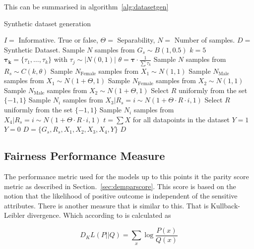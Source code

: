 This can be summarised in algorithm~\ref{alg:datasetgen}

\begin{algorithm}
    \caption{Synthetic dataset generation}
    \begin{algorithmic}
        \REQUIRE $I = $ Informative. True or false, $\Theta = $ Separability, $N =$ Number of samples.
        \ENSURE $D = $ Synthetic Dataset.
        \STATE Sample $N$ samples from $G_s \sim B(1, 0.5)$
        \STATE $k = 5$
        \STATE $\boldsymbol{\tau_k} = \{ \tau_1, \dots, \tau_k \}$ with $\tau_j \sim |N(0, 1)|$
        \STATE $\theta = \boldsymbol{\tau} \cdot \frac{1}{\sum \tau_k}$
        \STATE Sample $N$ samples from $R_s \sim C(k, \theta)$
        \STATE Sample $N_{\text{Female}}$ samples from $X_1 \sim N(1, 1)$
        \STATE Sample $N_{\text{Male}}$ samples from $X_1 \sim N(1 + \Theta, 1)$
        \STATE Sample $N_{\text{Female}}$ samples from $X_2 \sim N(1, 1)$
        \STATE Sample $N_{\text{Male}}$ samples from $X_2 \sim N(1 + \Theta, 1)$
        \STATE Select $R$ uniformly from the set $\{ -1, 1\}$
        \STATE Sample $N_i$ samples from $X_3 | R_s = i \sim N(1 + \Theta \cdot R \cdot i, 1)$
        \STATE Select $R$ uniformly from the set $\{ -1, 1\}$
        \STATE Sample $N_i$ samples from $X_4 | R_s = i \sim N(1 + \Theta \cdot R \cdot i, 1)$
        \ENDFOR
        \STATE $t = \sum X$ for all datapoints in the dataset
        \STATE $Y = 1$
        \ELSE
        \STATE $Y = 0$
        \ENDIF
        \STATE $D = \{G_s, R_s, X_1, X_2, X_3, X_4, Y \}$
        \RETURN $D$
    \end{algorithmic}
    \label{alg:datasetgen}
\end{algorithm}

\subsection{Fairness Performance Measure}

The performance metric used for the models up to this points it the parity score metric as described in Section.~\ref{sec:demparscore}. This score is based on the notion that the likelihood of positive outcome is independent of the sensitive attributes. There is another measure that is similar to this. That is Kullback-Leibler divergence. Which according to \citet{Mackay:2003:information} is calculated as 

\begin{equation*}
    D_KL(P ||Q) = \sum_x \log\frac{P(x)}{Q(x)}
\end{equation*}

